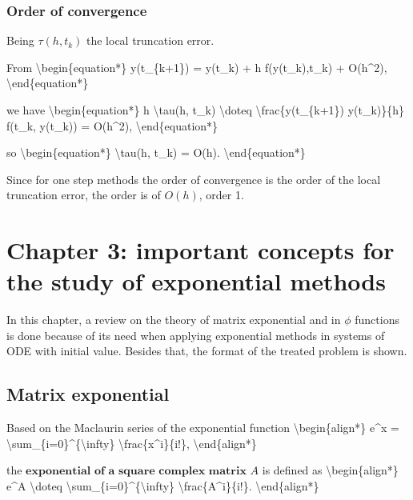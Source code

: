 \documentclass[letterpaper,10pt,english]{jupyterBook}
\begin{document}
\subsubsection{Order of convergence}
\label{\detokenize{cap2:order-of-convergence}}
\sphinxAtStartPar
Being \(\tau(h, t_k)\) the local truncation error.

\sphinxAtStartPar
From
\textbackslash{}begin\{equation*\}
y(t\_\{k+1\}) = y(t\_k) + h f(y(t\_k),t\_k) + O(h\textasciicircum{}2),
\textbackslash{}end\{equation*\}

\sphinxAtStartPar
we have
\textbackslash{}begin\{equation*\}
h \textbackslash{}tau(h, t\_k) \textbackslash{}doteq \textbackslash{}frac\{y(t\_\{k+1\}) \sphinxhyphen{} y(t\_k)\}\{h\} \sphinxhyphen{} f(t\_k, y(t\_k)) = O(h\textasciicircum{}2),
\textbackslash{}end\{equation*\}

\sphinxAtStartPar
so
\textbackslash{}begin\{equation*\}
\textbackslash{}tau(h, t\_k) = O(h).
\textbackslash{}end\{equation*\}

\sphinxAtStartPar
Since for one step methods the order of convergence is the order of the local truncation error, the order is of \(O(h)\), order 1.

\sphinxstepscope


\section{Chapter 3: important concepts for the study of exponential methods}
\label{\detokenize{cap3:chapter-3-important-concepts-for-the-study-of-exponential-methods}}\label{\detokenize{cap3::doc}}
\sphinxAtStartPar
In this chapter, a review on the theory of matrix exponential and in \(\phi\) functions is done because of its need when applying exponential methods in systems of ODE with initial value. Besides that, the format of the treated problem is shown.


\subsection{Matrix exponential}
\label{\detokenize{cap3:matrix-exponential}}
\sphinxAtStartPar
Based on the Maclaurin series of the exponential function
\textbackslash{}begin\{align*\}
e\textasciicircum{}x = \textbackslash{}sum\_\{i=0\}\textasciicircum{}\{\textbackslash{}infty\} \textbackslash{}frac\{x\textasciicircum{}i\}\{i!\},
\textbackslash{}end\{align*\}

\sphinxAtStartPar
the \(\textbf{exponential of a square complex matrix }A\) is defined as
\textbackslash{}begin\{align*\}
e\textasciicircum{}A \textbackslash{}doteq \textbackslash{}sum\_\{i=0\}\textasciicircum{}\{\textbackslash{}infty\} \textbackslash{}frac\{A\textasciicircum{}i\}\{i!\}.
\textbackslash{}end\{align*\}
\end{document}
